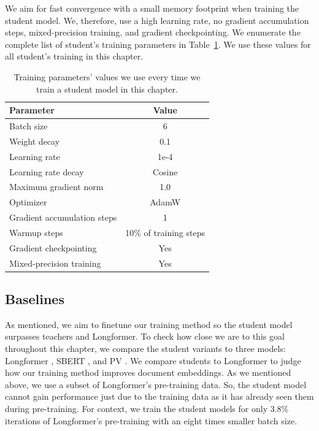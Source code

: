 We aim for fast convergence with a small memory footprint when training the
student model. We, therefore, use a high learning rate, no gradient
accumulation steps, mixed-precision training, and gradient checkpointing. We
enumerate the complete list of student's training parameters in
Table~\ref{table:student_train_params}. We use these values for all student's
training in this chapter.


\begin{table}
  \centering
  \footnotesize

  \begin{tabular}{l c}
    \toprule
    Parameter & Value \\
    \midrule
    Batch size & 6 \\
    Weight decay & 0.1 \\
    Learning rate & 1e-4 \\
    Learning rate decay & Cosine \\
    Maximum gradient norm & 1.0 \\
    Optimizer & AdamW \\
    Gradient accumulation steps & 1 \\
    Warmup steps & 10\% of training steps \\
    Gradient checkpointing & Yes \\
    Mixed-precision training & Yes \\
    \bottomrule
  \end{tabular}

  \caption{Training parameters' values we use every time we train a student model in this chapter.}

  \label{table:student_train_params}

\end{table}

\subsection{Baselines}

As mentioned, we aim to finetune our training method so the student model
surpasses teachers and Longformer. To check how close we are to this goal
throughout this chapter, we compare the student variants to three models:
Longformer \citep{beltagy2020longformer}, SBERT \citep{reimers2019sentence},
and PV \citep{le2014distributed}. We compare students to Longformer to judge
how our training method improves document embeddings. As we mentioned above, we
use a subset of Longformer's pre-training data. So, the student model cannot
gain performance just due to the training data as it has already seen them
during pre-training. For context, we train the student models for only 3.8\%
iterations of Longformer's pre-training with an eight times smaller batch size.

